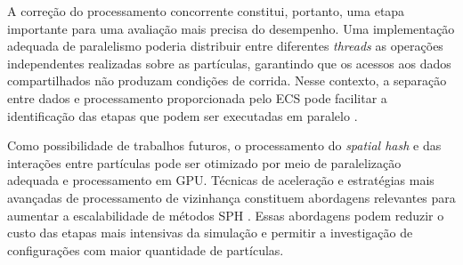 A correção do processamento concorrente constitui, portanto, uma etapa
importante para uma avaliação mais precisa do desempenho. Uma implementação
adequada de paralelismo poderia distribuir entre diferentes \textit{threads} as
operações independentes realizadas sobre as partículas, garantindo que os
acessos aos dados compartilhados não produzam condições de corrida. Nesse
contexto, a separação entre dados e processamento proporcionada pelo ECS pode
facilitar a identificação das etapas que podem ser executadas em paralelo
\cite{bilas2002}.

Como possibilidade de trabalhos futuros, o processamento do \textit{spatial
hash} e das interações entre partículas pode ser otimizado por meio de
paralelização adequada e processamento em GPU. Técnicas de aceleração e
estratégias mais avançadas de processamento de vizinhança constituem abordagens
relevantes para aumentar a escalabilidade de métodos SPH
\cite{koschier2020sph}. Essas abordagens podem reduzir o custo das etapas mais
intensivas da simulação e permitir a investigação de configurações com maior
quantidade de partículas.
